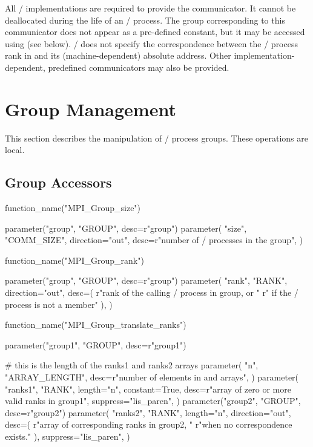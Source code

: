 All \MPI/ implementations are required to provide the 
communicator. It cannot be deallocated during the life of an \MPI/ process. The
group corresponding to this communicator does not appear as a pre-defined
constant, but it may be accessed using  (see below).
\MPI/ does not specify the correspondence between the \MPI/ process rank in
 and its (machine-dependent) absolute address.
Other implementation-dependent, predefined communicators may also be
provided.

\section{Group Management}
\label{sec:context:group-management}
This section describes the manipulation of \MPI/ process groups. These
operations are local.

\subsection{Group Accessors}
\label{subsec:context-grpacc}

%
\begin{mpi-binding}
    function_name("MPI_Group_size")
    
    parameter("group", "GROUP", desc=r"group")
    parameter(
        "size",
        "COMM_SIZE",
        direction="out",
        desc=r"number of \MPI/ processes in the group",
    )
\end{mpi-binding}

%
\begin{mpi-binding}
    function_name("MPI_Group_rank")
    
    parameter("group", "GROUP", desc=r"group")
    parameter(
        "rank",
        "RANK",
        direction="out",
        desc=(
            r"rank of the calling \MPI/ process in group, or "
            r" if the \MPI/ process is not a member"
        ),
    )
\end{mpi-binding}


%
\begin{mpi-binding}
    function_name("MPI_Group_translate_ranks")
    
    parameter("group1", "GROUP", desc=r"group1")
    
    # this is the length of the ranks1 and ranks2 arrays
    parameter(
        "n",
        "ARRAY_LENGTH",
        desc=r"number of elements in  and  arrays",
    )
    parameter(
        "ranks1",
        "RANK",
        length="n",
        constant=True,
        desc=r"array of zero or more valid ranks in group1",
        suppress="lis_paren",
    )
    parameter("group2", "GROUP", desc=r"group2")
    parameter(
        "ranks2",
        "RANK",
        length="n",
        direction="out",
        desc=(
            r"array of corresponding ranks in group2,  "
            r"when no correspondence exists."
        ),
        suppress="lis_paren",
    )
\end{mpi-binding}

